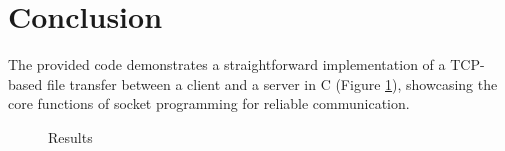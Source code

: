 \section{Conclusion}

The provided code demonstrates a straightforward implementation of a TCP-based file transfer between a client and a server in C (Figure \ref{fig:result}), showcasing the core functions of socket programming for reliable communication.

\begin{figure}[H]
    \centering
    \caption{Results}
    \label{fig:result}
\end{figure}